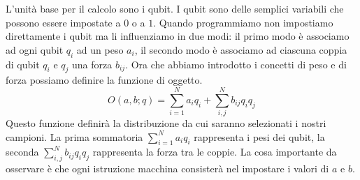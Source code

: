 L'unità base per il calcolo sono i qubit. I qubit sono delle semplici variabili che possono essere impostate a $0$ o a $1$. Quando programmiamo non impostiamo direttamente i qubit ma li influenziamo in due modi: il primo modo è associamo ad ogni qubit $q_i$ ad un peso $a_i$, il secondo modo è associamo ad ciascuna coppia di qubit $q_i$ e $q_j$ una forza $b_{ij}$. Ora che abbiamo introdotto i concetti di peso e di forza possiamo definire la funzione di oggetto.
$$O(a, b; q) = \sum_{i=1}^N a_i q_i + \sum_{i,j}^N b_{ij} q_i q_j$$
Questo funzione definirà la distribuzione da cui saranno selezionati i nostri campioni. La prima sommatoria $\sum_{i=1}^N a_i q_i$ rappresenta i pesi dei qubit, la seconda $\sum_{i,j}^N b_{ij} q_i q_j$ rappresenta la forza tra le coppie. La cosa importante da osservare è che ogni istruzione macchina consisterà nel impostare i valori di $a$ e $b$.

